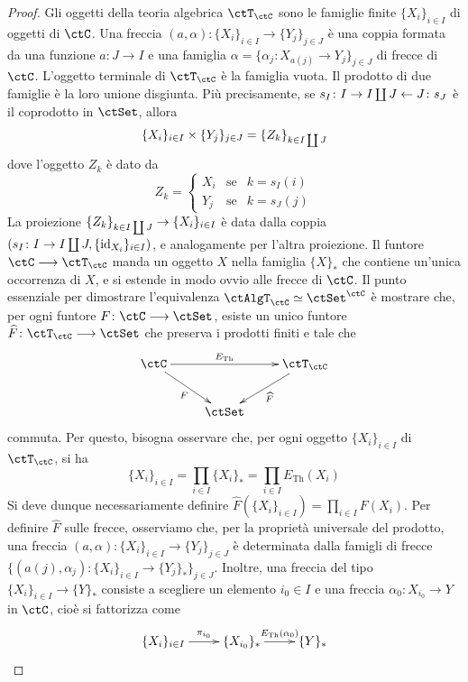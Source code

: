 \begin{proof}
 Gli oggetti della teoria algebrica \(\ctT_{\ctC}\) sono le famiglie finite \(\{X_i\}_{i \in I}\) di oggetti di \(\ctC\).
 Una freccia \((a,\alpha) \colon \{X_i\}_{i \in I} \to \{Y_j\}_{j \in J}\) è una coppia formata da una funzione \(a \colon J \to I\) e una
 famiglia \(\alpha = \{\alpha_j \colon X_{a(j)} \to Y_j\}_{j \in J}\) di frecce di \(\ctC\). L'oggetto terminale di \(\ctT_{\ctC}\) è la famiglia
 vuota. Il prodotto di due famiglie è la loro unione disgiunta. Più precisamente, se \(s_I \colon I \to I \coprod J \leftarrow J \colon s_J\)
 è il coprodotto in \(\ctSet\), allora
 \[\{X_i\}_{i \in I} \times \{Y_j\}_{j \in J} = \{Z_k\}_{k \in I \coprod J}\]
 dove l'oggetto \(Z_k\) è dato da
 \[Z_k = \left\{\begin{array}{rcl} X_i & \mbox{se} & k=s_I(i) \\ Y_j & \mbox{se} & k=s_J(j) \end{array}\right.\]
 La proiezione \(\{Z_k\}_{k \in I \coprod J} \to \{X_i\}_{i \in I}\) è data dalla coppia \((s_I \colon I \to I \coprod J, \{\mathrm{id}_{X_i}\}_{i \in I})\), e
 analogamente per l'altra proiezione.
 Il funtore \(\ctC \fun \ctT_{\ctC}\) manda un oggetto \(X\) nella famiglia \(\{X\}_{\ast}\) che contiene
 un'unica occorrenza di \(X\), e si estende in modo ovvio alle frecce di \(\ctC\).
 Il punto essenziale per dimostrare l'equivalenza
 \(\ctAlgT_{\ctC} \simeq \ctSet^{\ctC}\) è mostrare che, per ogni funtore \(F \colon \ctC \fun \ctSet\), esiste un unico funtore
 \(\widehat{F} \colon \ctT_{\ctC} \fun \ctSet\) che preserva i prodotti finiti e tale che
 \[\xymatrix{\ctC \ar[rr]^-{E_{\mathrm{Th}}} \ar[rd]_{F} & & \ctT_{\ctC} \ar[ld]^{\widehat{F}} \\ & \ctSet}\]
 commuta. Per questo, bisogna osservare che, per ogni oggetto \(\{X_i\}_{i \in I}\) di \(\ctT_{\ctC}\), si ha
 \[\{X_i\}_{i \in I} = \prod_{i \in I}\{X_i\}_{\ast} = \prod_{i \in I} E_{\mathrm{Th}} (X_i)\]
 Si deve dunque necessariamente definire \(\widehat{F}(\{X_i\}_{i \in I}) = \prod_{i \in I}F(X_i)\).
 Per definire \(\widehat{F}\) sulle frecce, osserviamo che, per la proprietà universale del prodotto, una freccia
 \((a,\alpha) \colon \{X_i\}_{i \in I} \to \{Y_j\}_{j \in J}\) è determinata dalla famigli di frecce
 \(\{(a(j),\alpha_j) \colon \{X_i\}_{i \in I} \to \{Y_j\}_{\ast}\}_{j \in J}\). Inoltre, una freccia del tipo
 \(\{X_i\}_{i \in I} \to \{Y\}_{\ast}\) consiste a scegliere un elemento \(i_0 \in I\) e una freccia \(\alpha_0 \colon X_{i_0} \to Y\)
 in \(\ctC\), cioè si fattorizza come
 \[\xymatrix{\{X_i\}_{i \in I} \ar[r]^-{\pi_{i_0}} & \{X_{i_0}\}_{\ast} \ar[r]^-{E_{\mathrm{Th}}(\alpha_0)} & \{Y\}_{\ast}}\]

\end{proof}
